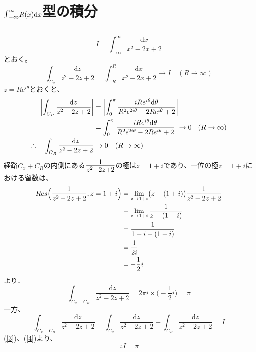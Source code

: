 \documentclass[dvipdfmx,a4paper]{jsarticle}
\begin{document}
\section{$\mbox{\Large$\int$}^{\infty}_{-\infty}R(x)\mathrm{d}x$型の積分}
\subsection{}
$$
I = \int^{\infty}_{-\infty}\frac{\mathrm{d}x}{x^2 - 2x + 2}
$$
とおく。
$$
\int_{C_x}\frac{\mathrm{d}z}{z^2 - 2z + 2} = \int^{R}_{-R}\frac{\mathrm{d}x}{x^2 - 2x + 2} \to I \quad(R \to \infty)
$$
$z = Re^{i\theta}$とおくと、
\begin{align*}
\biggl|\int_{C_R}\frac{\mathrm{d}z}{z^2 - 2z + 2}\biggr| &= \biggl|\int^{\pi}_{0}\frac{i Re^{i\theta}\mathrm{d}\theta}{R^2e^{2i\theta} - 2Re^{i\theta} + 2}\biggr|\\
&= \int^{\pi}_{0}\Bigl|\frac{i Re^{i\theta}\mathrm{d}\theta}{R^2e^{2i\theta} - 2Re^{i\theta} + 2}\Bigr| \to 0 \quad(R \to \infty)\\
\therefore \quad\int_{C_R}\frac{\mathrm{d}z}{z^2 - 2z + 2} &\to 0 \quad(R \to \infty)
\end{align*}
経路$C_x + C_R$の内側にある$\mbox{\Large$\frac{1}{z^2 - 2z + 2}$}$の極は$z = 1+i$であり、一位の極$z = 1+i$における留数は、
\begin{align*}
Res\Bigl(\frac{1}{z^2 - 2z + 2}, z = 1+i\Bigr) &= \lim_{z \to 1+i}\bigl(z - (1+i)\bigr)\frac{1}{z^2 - 2z + 2}\\
&= \lim_{z \to 1+i}\frac{1}{z - (1-i)}\\
&= \frac{1}{1+i - (1-i)}\\
&= \frac{1}{2i}\\
&= -\frac{1}{2}i
\end{align*}
より、
\begin{equation}
\label{3}
\int_{C_x + C_R}\frac{\mathrm{d}z}{z^2 - 2z + 2} = 2\pi i \times \bigl(-\frac{1}{2}i\bigr) = \pi
\end{equation}
一方、
\begin{equation}
\label{4}
\int_{C_x + C_R}\frac{\mathrm{d}z}{z^2 - 2z + 2} = \int_{C_x}\frac{\mathrm{d}z}{z^2 - 2z + 2} + \int_{C_R}\frac{\mathrm{d}z}{z^2 - 2z + 2} = I
\end{equation}
(\ref{3})、(\ref{4})より、
$$
\therefore I = \pi
$$
\\

\end{document}
